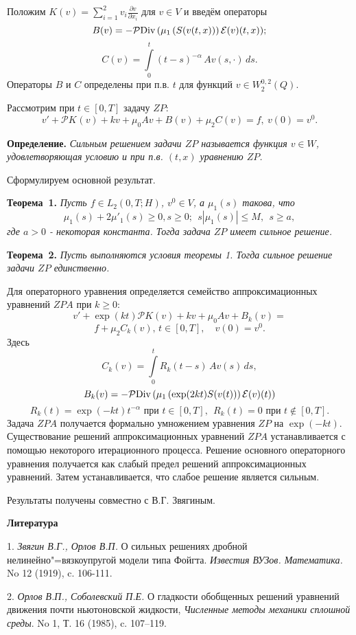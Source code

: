 Положим
$K(v)=\sum_{i=1}^2 v_i\frac{\partial v}{\partial x_i}$ для $v\in V$ и введём операторы
$$
B(v) = - {\mathcal{P}}{\rm Div} \, (\mu_1\,(S(v(t,x)))\,\mathcal{E}(v)(t,x));
$$
$$ C(v)=\int\limits_{0}^t(t-s)^{-\alpha}\,A v(s, \cdot )\,ds.
$$
Операторы $B$ и
$C$ определены при п.в. $t$ для функций $v\in W_2^{0,2}(Q)$.

Рассмотрим при $ t\in[0,T]$ задачу $ZP$:
$$
v'+\mathcal{P}K_{}( v)+ k v+\mu_0 Av +B(v)+\mu_2C(v)= f,\ v(0)=v^0.
$$


\textbf{Определение.} {\it
Сильным решением задачи $ZP$ называется функция $v\in W$, удовлетворяющая условию и при п.в. $(t,x)$ уравнению $ZP$.}

Сформулируем основной результат.

\textbf{Теорема~1.} {\it Пусть $f\in L_2 (0,T;H)$, $v^0\in V$, а $\mu_1(s)$ такова, что
$$
 \mu_1(s)+2\mu'_1(s)\ge 0, s\ge 0; \ \ s|\mu_1(s)|\le M,\ \ s\ge a,
$$
где $a>0$ - некоторая константа. Тогда задача $ZP$ имеет сильное решение.}


\textbf{Теорема~2.} {\it Пусть выполняются условия теоремы 1.
Тогда сильное решение задачи $ZP$ единственно.}

 Для операторного уравнения
определяется семейство аппроксимационных уравнений $ZPA$ при $k\ge 0$:
$$
v'+\exp(kt)\mathcal{P}K(v)+ k v+\mu_0 Av +B_k(v)=
$$
$$
f+\mu_2 C_k(v),\, t\in[0,T], \quad v(0)=v^0.
$$
Здесь
$$
C_k(v)=\int\limits_{0}^tR_k(t-s)\,A v(s)\,ds,
$$
$$
B_k(v) = - {\mathcal{P}}{\rm Div} \, (\mu_1\,(\exp(2kt)S(v(t)))\,\mathcal{E}(v)(t))
$$
$$
R_k(t)=\exp(-kt)t^{-\alpha} \mbox{ при } t\in[0,T],\ \ R_k(t)=0 \mbox{ при } t\notin[0,T].
$$
 Задача $ZPA$ получается формально умножением уравнения $ZP$ на $\exp(-kt)$.
 Существование
решений аппроксимационных уравнений $ZPA$ устанавливается с помощью
некоторого итерационного процесса. Решение основного операторного уравнения получается как
слабый предел решений аппроксимационных уравнений. Затем устанавливается, что слабое решение является сильным.




Результаты получены совместно с В.Г. Звягиным.



\smallskip \centerline {\bf Литература} \nopagebreak

1. {\it Звягин В.Г., Орлов В.П.} О сильных решениях дробной нелинейно"=вязкоупругой модели типа Фойгта. {\it Известия \newline ВУЗов. Математика.} No 12 (1919), c. 106-111.

2. {\it Орлов В.П., Соболевский П.Е.} О гладкости обоб\-щен\-ных решений уравнений движения почти ньютоновской \newline жидкости, {\it Численные методы механики сплошной среды}. \newline No 1, Т. 16 (1985), c. 107--119.
